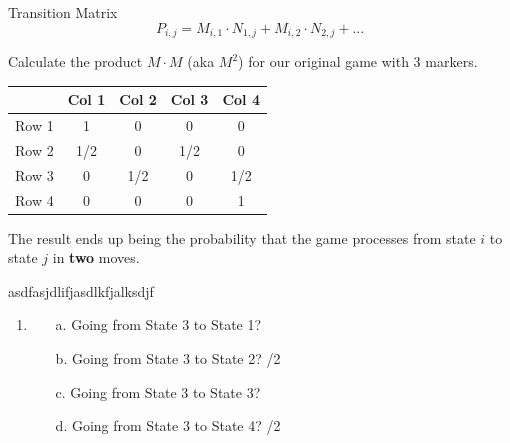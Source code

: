 {\begin{intro}{Transition Matrix}
            $$ P_{i,j} = M_{i,1} \cdot N_{1,j} + M_{i,2} \cdot N_{2,j} + ... $$
        \end{intro}


    \begin{questionNOGRADE}{\thequestion}
        Calculate the product $M \cdot M$ (aka $M^{2}$) for our
        original game with 3 markers.
        
        \begin{center}
            \large
            \begin{tabular}{ l | c c c c |}
                & Col 1 & Col 2 & Col 3 & Col 4
                \\ \hline
                Row 1 & 1 & 0 & 0 & 0
                \\
                Row 2 & 1/2 & 0 & 1/2 & 0
                \\
                Row 3 & 0 & 1/2 & 0 & 1/2
                \\
                Row 4 & 0 & 0 & 0 & 1
            \end{tabular}
        \end{center}
        
        The result ends up being the probability that the game processes from
        state $i$ to state $j$ in \textbf{two} moves.
        
            asdfasjdlifjasdlkfjalksdjf
    \end{questionNOGRADE}

        
}{

    \begin{enumerate}
        \item   
            \begin{itemize}
                \item[a.] Going from State 3 to State 1? 
                \item[b.] Going from State 3 to State 2? /2
                \item[c.] Going from State 3 to State 3? 
                \item[d.] Going from State 3 to State 4? /2
            \end{itemize}


\end{enumerate}}
